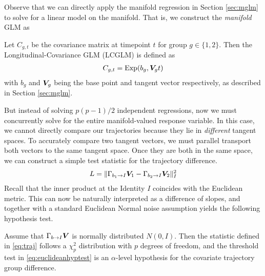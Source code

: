 Observe that we can directly apply the manifold regression in Section \ref{sec:mglm} to solve for a linear model on the manifold. 
That is, we construct the \textit{manifold} GLM as
\begin{definition} Let $C_{g,t}$ be the covariance matrix at timepoint $t$ for group $g \in \{1,2\}$. Then the 
	Longitudinal-Covariance GLM (LCGLM) is defined as
	\begin{align}\label{eq:LCGLM}
		C_{g,t} = \text{Exp}(b_g, \bm{V}_g t)
	\end{align}
	with $b_g$ and $\bm{V}_g$ being the base point and tangent vector respectively, as described in Section \ref{sec:mglm}.
\label{eq:lcglm}
\end{definition}
But instead of solving $p(p-1)/2$ independent regressions, now we must concurrently solve for the entire manifold-valued response variable.
In this case, we cannot directly compare our trajectories because they lie in {\em different} tangent spaces. To accurately compare two tangent vectors, 
we must parallel transport both vectors to the same tangent space. Once they are both in the same space, we can construct a simple test statistic for the trajectory difference.
\begin{align}
L = \|\Gamma_{b_1 \rightarrow I} \bm{V}_1 - \Gamma_{b_2 \rightarrow I} \bm{V}_2 \|_{I}^2
\label{eq:traj}
\end{align}
Recall that the inner product at the Identity $I$ coincides with the Euclidean metric. This can now be naturally interpreted as a difference of slopes, and together with a standard Euclidean Normal noise assumption yields the following hypothesis test.
\begin{proposition}\label{prop_prodstat}
Assume that $\Gamma_{b \rightarrow I} \bm{V}$ is normally distributed $N(0,I)$. Then the statistic defined in \eqref{eq:traj} follows a $\chi^2_{p}$ distribution with $p$ degrees of freedom, and the threshold test in \eqref{eq:euclideanhyptest} is an $\alpha$-level hypothesis for the covariate trajectory group difference.
\end{proposition}

